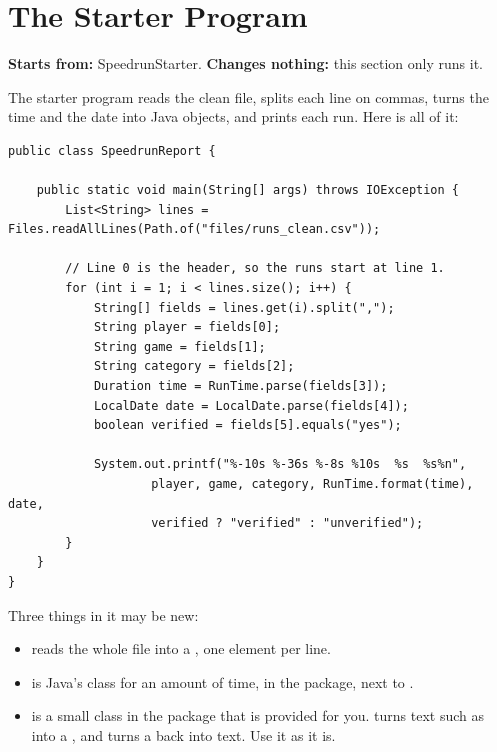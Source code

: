 \documentclass[11pt]{article}
\begin{document}
\section{The Starter Program}

\textbf{Starts from:} SpeedrunStarter. \quad \textbf{Changes nothing:} this section only runs it.

The starter program reads the clean file, splits each line on commas, turns the time and the date
into Java objects, and prints each run. Here is all of it:

\begin{lstlisting}
public class SpeedrunReport {

    public static void main(String[] args) throws IOException {
        List<String> lines = Files.readAllLines(Path.of("files/runs_clean.csv"));

        // Line 0 is the header, so the runs start at line 1.
        for (int i = 1; i < lines.size(); i++) {
            String[] fields = lines.get(i).split(",");
            String player = fields[0];
            String game = fields[1];
            String category = fields[2];
            Duration time = RunTime.parse(fields[3]);
            LocalDate date = LocalDate.parse(fields[4]);
            boolean verified = fields[5].equals("yes");

            System.out.printf("%-10s %-36s %-8s %10s  %s  %s%n",
                    player, game, category, RunTime.format(time), date,
                    verified ? "verified" : "unverified");
        }
    }
}
\end{lstlisting}

Three things in it may be new:

\begin{itemize}[leftmargin=1.4em]
  \item {} reads the whole file into a , one element per
        line.
  \item {} is Java's class for an amount of time, in the  package,
        next to .
  \item {} is a small class in the  package that is provided for you.
         turns text such as  into a , and
         turns a  back into text. Use it as it is.
\end{itemize}
\end{document}
